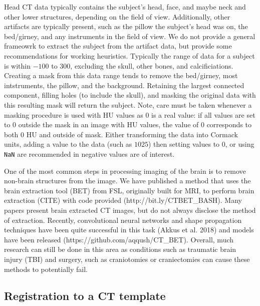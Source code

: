 \documentclass[]{elsarticle} %
\begin{document}
Head CT data typically contains the subject's head, face, and maybe neck
and other lower structures, depending on the field of view.
Additionally, other artifacts are typically present, such as the pillow
the subject's head was on, the bed/girney, and any instruments in the
field of view. We do not provide a general frameowrk to extract the
subject from the artifact data, but provide some recommendations for
working heuristics. Typically the range of data for a subject is within
\(-100\) to \(300\), excluding the skull, other bones, and
calcificiations. Creating a mask from this data range tends to remove
the bed/girney, most intstruments, the pillow, and the background.
Retaining the largest connected component, filling holes (to include the
skull), and masking the original data with this resulting mask will
return the subject. Note, care must be taken whenever a masking
procedure is used with HU values as \(0\) is a real value: if all values
are set to \(0\) outside the mask in an image with HU values, the value
of \(0\) corresponds to both \(0\) HU and outside of mask. Either
transforming the data into Cormack units, adding a value to the data
(such as \(1025\)) then setting values to \(0\), or using \texttt{NaN}
are recommended in negative values are of interest.

One of the most common steps in processing imaging of the brain is to
remove non-brain structures from the image. We have published a method
that uses the brain extraction tool (BET) from FSL, originally built for
MRI, to perform brain extraction (CITE) with code provided
(http://bit.ly/CTBET\_BASH). Many papers present brain extracted CT
images, but do not always disclose the method of extraction. Recently,
convolutional neural networks and shape propagation techniques have been
quite successful in this task (Akkus et al. 2018) and models have been
released (https://github.com/aqqush/CT\_BET). Overall, much research can
still be done in this area as conditions such as traumatic brain injury
(TBI) and surgery, such as craniotomies or craniectomies can cause these
methods to potentially fail.

\hypertarget{registration-to-a-ct-template}{%
\subsection{Registration to a CT
template}\label{registration-to-a-ct-template}}
\end{document}
